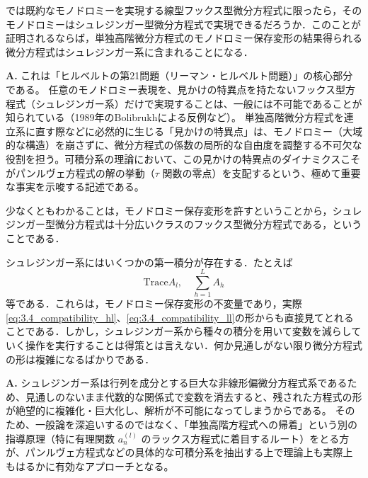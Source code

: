 では既約なモノドロミーを実現する線型フックス型微分方程式に限ったら，そのモノドロミーはシュレジンガー型微分方程式で実現できるだろうか．このことが証明されるならば，単独高階微分方程式のモノドロミー保存変形の結果得られる微分方程式はシュレジンガー系に含まれることになる．

\begin{Q}
\textbf{A.} これは「ヒルベルトの第21問題（リーマン・ヒルベルト問題）」の核心部分である。
任意のモノドロミー表現を、見かけの特異点を持たないフックス型方程式（シュレジンガー系）だけで実現することは、一般には不可能であることが知られている（1989年のBolibrukhによる反例など）。
単独高階微分方程式を連立系に直す際などに必然的に生じる「見かけの特異点」は、モノドロミー（大域的な構造）を崩さずに、微分方程式の係数の局所的な自由度を調整する不可欠な役割を担う。可積分系の理論において、この見かけの特異点のダイナミクスこそがパンルヴェ方程式の解の挙動（$\tau$ 関数の零点）を支配するという、極めて重要な事実を示唆する記述である。
\end{Q}

少なくともわかることは，モノドロミー保存変形を許すということから，シュレジンガー型微分方程式は十分広いクラスのフックス型微分方程式である，ということである．

シュレジンガー系にはいくつかの第一積分が存在する．たとえば
\[
  \mathrm{Trace} A_l, \quad \sum_{h=1}^L A_h
\]
等である．これらは，モノドロミー保存変形の不変量であり，実際\eqref{eq:3.4_compatibility_hl}、\eqref{eq:3.4_compatibility_ll}の形からも直接見てとれることである．しかし，シュレジンガー系から種々の積分を用いて変数を減らしていく操作を実行することは得策とは言えない．何か見通しがない限り微分方程式の形は複雑になるばかりである．

\begin{Q}
\textbf{A.} シュレジンガー系は行列を成分とする巨大な非線形偏微分方程式系であるため、見通しのないまま代数的な関係式で変数を消去すると、残された方程式の形が絶望的に複雑化・巨大化し、解析が不可能になってしまうからである。
そのため、一般論を深追いするのではなく、「単独高階方程式への帰着」という別の指導原理（特に有理関数 $a_n^{(l)}$ のラックス方程式に着目するルート）をとる方が、パンルヴェ方程式などの具体的な可積分系を抽出する上で理論上も実際上もはるかに有効なアプローチとなる。
\end{Q}

